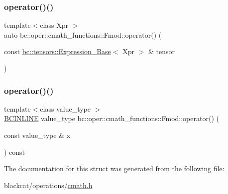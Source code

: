 \mbox{\label{structbc_1_1oper_1_1cmath__functions_1_1Fmod_a2c3c5f9bc0566e90fe25f65658e655a2}} 
\subsubsection{\texorpdfstring{operator()()}{operator()()}\hspace{0.1cm}{\footnotesize\ttfamily [2/3]}}
{\footnotesize\ttfamily template$<$class Xpr $>$ \\
auto bc\+::oper\+::cmath\+\_\+functions\+::\+Fmod\+::operator() (\begin{DoxyParamCaption}\item[{const \hyperlink{classbc_1_1tensors_1_1Expression__Base}{bc\+::tensors\+::\+Expression\+\_\+\+Base}$<$ Xpr $>$ \&}]{tensor }\end{DoxyParamCaption})\hspace{0.3cm}{\ttfamily [inline]}}

\mbox{\label{structbc_1_1oper_1_1cmath__functions_1_1Fmod_a8aae440a5e7ac70ec7a1e9883a2bd11d}} 
\subsubsection{\texorpdfstring{operator()()}{operator()()}\hspace{0.1cm}{\footnotesize\ttfamily [3/3]}}
{\footnotesize\ttfamily template$<$class value\+\_\+type $>$ \\
\hyperlink{common_8h_a6699e8b0449da5c0fafb878e59c1d4b1}{B\+C\+I\+N\+L\+I\+NE} value\+\_\+type bc\+::oper\+::cmath\+\_\+functions\+::\+Fmod\+::operator() (\begin{DoxyParamCaption}\item[{const value\+\_\+type \&}]{x }\end{DoxyParamCaption}) const\hspace{0.3cm}{\ttfamily [inline]}}



The documentation for this struct was generated from the following file\+:\begin{DoxyCompactItemize}
\item 
blackcat/operations/\hyperlink{cmath_8h}{cmath.\+h}\end{DoxyCompactItemize}
